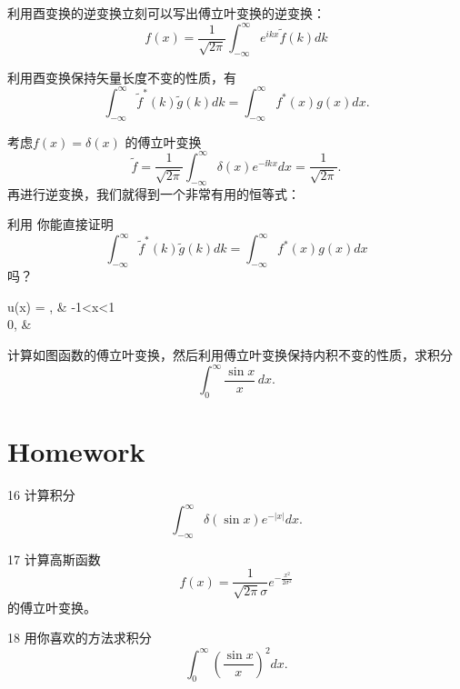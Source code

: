 \documentclass[CJK]{beamer}
\begin{document}
\begin{frame}
  \bch
  利用酉变换的逆变换立刻可以写出傅立叶变换的逆变换：
{\blue
  $$ f(x) = \frac{1}{\sqrt{2\pi}} \int_{-\infty}^\infty e^{ikx} \tilde{f}(k) dk $$
 }
  
  \ech
\end{frame}


\begin{frame}
  \bch
  利用酉变换保持矢量长度不变的性质，有
{\blue
 $$\int_{-\infty}^\infty \tilde{f}^*(k) \tilde{g}(k) dk = \int_{-\infty}^\infty f^*(x)g(x) dx. $$
 }
  
  \ech
\end{frame}

\begin{frame}
  \bch
  考虑$f(x) = \delta(x)$ 的傅立叶变换
  $$\tilde{f} = \frac{1}{\sqrt{2\pi}} \int_{-\infty}^{\infty} \delta(x) e^{-\ii kx}dx = \frac{1}{\sqrt{2\pi}}.$$
  再进行逆变换，我们就得到一个非常有用的恒等式：
  \ech
\end{frame}


\begin{frame}
  \bch
  
  利用
    你能直接证明
    $$\int_{-\infty}^\infty \tilde{f}^*(k) \tilde{g}(k) dk = \int_{-\infty}^\infty f^*(x)g(x) dx $$
    吗？
  \ech
\end{frame}

\begin{frame}
  \bch
  \emini
  \be
  u(x) = , &  -1<x<1 \\ 0, &  \branchrr
  \ee
  \emini

  \skipline
  
  计算如图函数的傅立叶变换，然后利用傅立叶变换保持内积不变的性质，求积分
  $$\int_0^\infty \frac{\sin x}{x} \,dx. $$
  
  \ech
\end{frame}

\section{Homework}

\begin{frame}
  \bch
  \bitem
\item[16]{计算积分$$\int_{-\infty}^\infty \delta\left(\sin x\right) e^{-|x|} dx.$$ }
\item[17]{计算高斯函数$$f(x) = \frac{1}{\sqrt{2\pi}\sigma} e^{-\frac{x^2}{2\sigma^2}}$$
的傅立叶变换。}
\item[18]{用你喜欢的方法求积分
  $$\int_0^\infty \left(\frac{\sin x}{x}\right)^2dx . $$}
  \eitem
  \ech
\end{frame}
\end{document}

